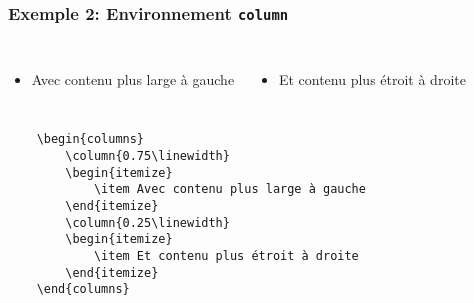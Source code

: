 \documentclass[t,aspectratio=169]{beamer}
\begin{document}
\begin{frame}[fragile]
    \frametitle{Exemple 2: Environnement \texttt{column}}
    \begin{columns}
        \begin{itemize}
            \item Avec contenu plus large à gauche
        \end{itemize}
        \begin{itemize}
            \item Et contenu plus étroit à droite 
        \end{itemize}
    \end{columns}
{\scriptsize
\begin{verbatim}
    \begin{columns}
        \column{0.75\linewidth}
        \begin{itemize}
            \item Avec contenu plus large à gauche
        \end{itemize}
        \column{0.25\linewidth}
        \begin{itemize}
            \item Et contenu plus étroit à droite 
        \end{itemize}
    \end{columns}
\end{verbatim}
}
\end{frame}
\end{document}

